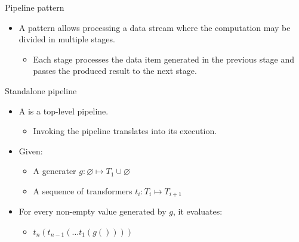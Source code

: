 \begin{frame}[t]{Pipeline pattern}
\begin{itemize}
  \item A  pattern allows processing a data stream where the
        computation may be divided in multiple stages.
    \begin{itemize}
      \item Each stage processes the data item generated in the previous stage
            and passes the produced result to the next stage.
    \end{itemize}
\end{itemize}
\end{frame}

\begin{frame}[t]{Standalone pipeline}
\begin{itemize}
  \item A   is a top-level pipeline.
    \begin{itemize}
      \item Invoking the pipeline translates into its execution.
    \end{itemize}

  \vfill\pause
  \item Given:
    \begin{itemize}
      \item A generater $g : \varnothing \mapsto T_1 \cup \varnothing$
      \item A sequence of transformers $t_i : T_i \mapsto T_{i+1}$
    \end{itemize}

  \vfill\pause
  \item For every non-empty value generated by $g$, it evaluates:
    \begin{itemize}
      \item $t_n(t_{n-1}(\ldots t_1(g())))$
    \end{itemize}
\end{itemize}
\end{frame}

